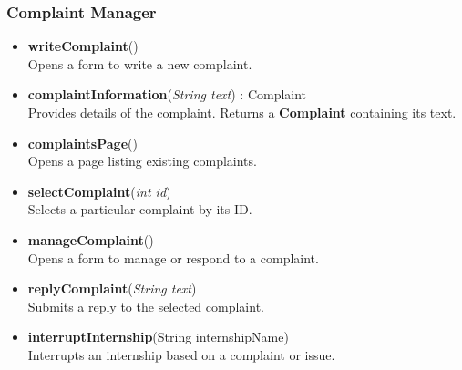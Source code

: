 \subsubsection*{Complaint Manager}
\begin{itemize}

    \item \textbf{writeComplaint}() \\
    Opens a form to write a new complaint.

    \item \textbf{complaintInformation}(\textit{String text}) : Complaint \\
    Provides details of the complaint.
    Returns a \textbf{Complaint} containing its text.

    \item \textbf{complaintsPage}() \\
    Opens a page listing existing complaints.

    \item \textbf{selectComplaint}(\textit{int id}) \\
    Selects a particular complaint by its ID.

    \item \textbf{manageComplaint}() \\
    Opens a form to manage or respond to a complaint.

    \item \textbf{replyComplaint}(\textit{String text}) \\
    Submits a reply to the selected complaint.

    \item \textbf{interruptInternship}(String internshipName) \\
    Interrupts an internship based on a complaint or issue.

\end{itemize}

